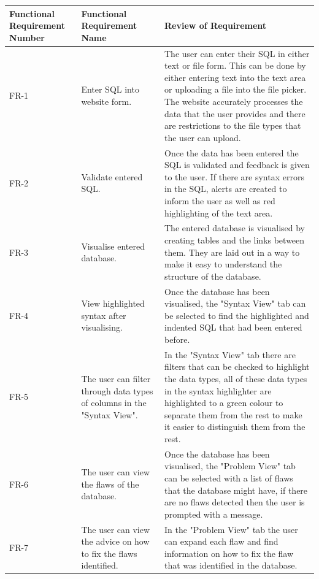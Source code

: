 \begin{center}
	\setlength\extrarowheight{2pt}
	\begin{tabularx}{\textwidth}{|X|X|X|}
		\hline
		\textbf{Functional Requirement Number} & \textbf{Functional Requirement Name} & \textbf{Review of Requirement} \\
		\hline
		FR-1 &  Enter SQL into website form. & The user can enter their SQL in either text or file form. This can be done by either entering text into the text area or uploading a file into the file picker. The website accurately processes the data that the user provides and there are restrictions to the file types that the user can upload. \\
		\hline
		FR-2 & Validate entered SQL. & Once the data has been entered the SQL is validated and feedback is given to the user. If there are syntax errors in the SQL, alerts are created to inform the user as well as red highlighting of the text area.\\
		\hline
		FR-3 & Visualise entered database. & The entered database is visualised by creating tables and the links between them. They are laid out in a way to make it easy to understand the structure of the database.\\
		\hline
		FR-4 & View highlighted syntax after visualising. & Once the database has been visualised, the "Syntax View" tab can be selected to find the highlighted and indented SQL that had been entered before. \\
		\hline
		FR-5 & The user can filter through data types of columns in the "Syntax View". & In the "Syntax View" tab there are filters that can be checked to highlight the data types, all of these data types in the syntax highlighter are highlighted to a green colour to separate them from the rest to make it easier to distinguish them from the rest. \\
		\hline
		FR-6 & The user can view the flaws of the database. & Once the database has been visualised, the "Problem View" tab can be selected with a list of flaws that the database might have, if there are no flaws detected then the user is prompted with a message. \\
		\hline
		FR-7 & The user can view the advice on how to fix the flaws identified. & In the "Problem View" tab the user can expand each flaw and find information on how to fix the flaw that was identified in the database. \\
		\hline
	\end{tabularx}
\end{center}